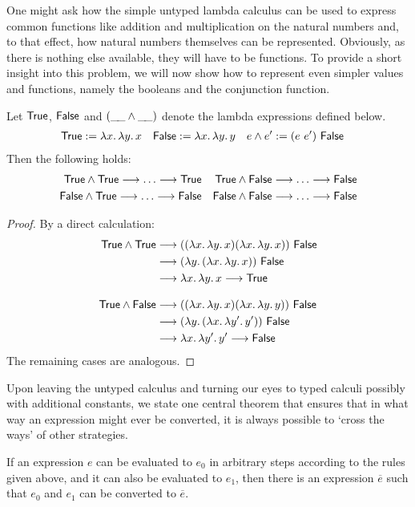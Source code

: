 One might ask how the simple untyped lambda calculus can be used to express
common functions like addition and multiplication on the natural numbers and, to
that effect, how natural numbers themselves can be represented. Obviously, as
there is nothing else available, they will have to be functions. To provide a
short insight into this problem, we will now show how to represent even simpler
values and functions, namely the booleans and the conjunction function.
\begin{lem}
Let $\mathsf{True}$, $\mathsf{False}$ and $(\_\!\_ \land \_\!\_)$ denote the lambda expressions defined
below.
\begin{align*}
\mathsf{True} &:= {\lambda x.\,{\lambda y.\,x}} & 
\mathsf{False} &:= {\lambda x.\,{\lambda y.\,y}} &
e \land e' &:= (e\ e')\ \mathsf{False}
\end{align*}
Then
the following holds:
\begin{align*}
  \mathsf{True} \land \mathsf{True} \longrightarrow \ldots \longrightarrow \mathsf{True} &&
  \mathsf{True} \land \mathsf{False} \longrightarrow \ldots \longrightarrow \mathsf{False} \\
  \mathsf{False} \land \mathsf{True} \longrightarrow \ldots \longrightarrow \mathsf{False} &&
  \mathsf{False} \land \mathsf{False} \longrightarrow \ldots \longrightarrow \mathsf{False}
\end{align*}
\end{lem}
\begin{proof}
By a direct calculation:
\begin{align*}
  \mathsf{True} \land \mathsf{True} &\longrightarrow 
  (({\lambda x.\,{\lambda y.\,x}}) ({\lambda x.\,{\lambda y.\,x}}))
  \ \mathsf{False} \\
  &\longrightarrow ({\lambda y.\,({\lambda x.\,{\lambda y.\,x}})}) \ \mathsf{False} \\
  &\longrightarrow {\lambda x.\,{\lambda y.\,x}} \longrightarrow \mathsf{True} \\[2ex]
  \mathsf{True} \land \mathsf{False} &\longrightarrow
  (({\lambda x.\,{\lambda y.\,x}}) ({\lambda x.\,{\lambda y.\,y}}))
  \ \mathsf{False} \\ 
  &\longrightarrow ({\lambda y.\,({\lambda x.\,{\lambda y'.\,y'}})})\ \mathsf{False} \\
  &\longrightarrow {\lambda x.\,{\lambda y'.\,y'}} \longrightarrow \mathsf{False}
\end{align*}
The remaining cases are analogous.
\end{proof}

Upon leaving the untyped calculus and turning our eyes to typed calculi possibly
with additional constants, we state one central theorem that ensures that in
what way an expression might ever be converted, it is always possible to
`cross the ways' of other strategies.
\begin{prop} \label{thm:church-rosser}
If an expression $e$ can be evaluated to $e_0$ in arbitrary steps according to the
rules given above, and it can also be evaluated to $e_1$, then there is an
expression $\overline{e}$ such that $e_0$ and $e_1$ can be converted to $\overline{e}$.
\end{prop}

